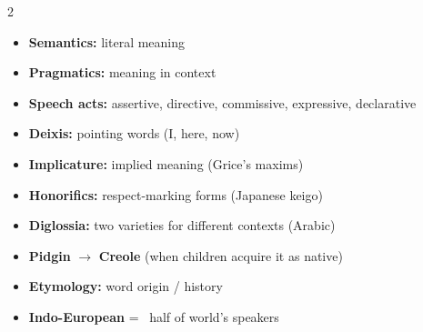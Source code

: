 \documentclass[11pt, letterpaper]{article}
\begin{document}
\vspace{4pt}

\begin{tcolorbox}[colback=part7bg, colframe=sectiongrey,
  title={\bfseries Semantics, Pragmatics \& Other Concepts}, arc=3pt, boxrule=1pt]
\footnotesize
\begin{multicols}{2}
\begin{itemize}[noitemsep, leftmargin=*]
  \item \textbf{Semantics:} literal meaning
  \item \textbf{Pragmatics:} meaning in context
  \item \textbf{Speech acts:} assertive, directive, commissive, expressive, declarative
  \item \textbf{Deixis:} pointing words (I, here, now)
  \item \textbf{Implicature:} implied meaning (Grice's maxims)
\end{itemize}
\columnbreak
\begin{itemize}[noitemsep, leftmargin=*]
  \item \textbf{Honorifics:} respect-marking forms (Japanese keigo)
  \item \textbf{Diglossia:} two varieties for different contexts (Arabic)
  \item \textbf{Pidgin} $\to$ \textbf{Creole} (when children acquire it as native)
  \item \textbf{Etymology:} word origin / history
  \item \textbf{Indo-European} = ~half of world's speakers
\end{itemize}
\end{multicols}
\end{tcolorbox}
\end{document}
